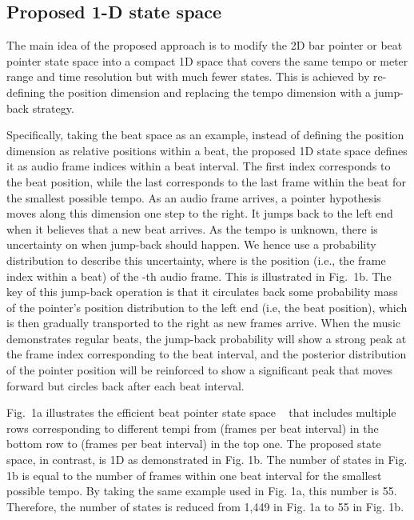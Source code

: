 \documentclass{article}
\begin{document}
\subsection{Proposed 1-D state space}
\label{ssec:1D state space}
The main idea of the proposed approach is to modify the 2D bar pointer or beat pointer state space into a compact 1D space that covers the same tempo or meter range and time resolution but with much fewer states. This is achieved by re-defining the position dimension and replacing the tempo dimension with a jump-back strategy. 

Specifically, taking the beat space as an example, instead of defining the position dimension as relative positions within a beat, the proposed 1D state space defines it as audio frame indices within a beat interval. The first index corresponds to the beat position, while the last corresponds to the last frame within the beat for the smallest possible tempo. As an audio frame arrives, a pointer hypothesis moves along this dimension one step to the right. It jumps back to the left end when it believes that a new beat arrives. As the tempo is unknown, there is uncertainty on when jump-back should happen. We hence use a probability distribution  to describe this uncertainty, where  is the position (i.e., the frame index within a beat) of the -th audio frame. This is illustrated in Fig.~1b. The key of this jump-back operation is that it circulates back some probability mass of the pointer's position distribution to the left end (i.e, the beat position), which is then gradually transported to the right as new frames arrive. When the music demonstrates regular beats, the jump-back probability will show a strong peak at the frame index corresponding to the beat interval, and the posterior distribution of the pointer position will be reinforced to show a significant peak that moves forward but circles back after each beat interval.
 
Fig.~1a illustrates the efficient beat pointer state space ~\cite{Krebs:1} that includes multiple rows 
corresponding to different tempi from  (frames per beat interval) in the bottom row to  (frames per beat interval) in the top one. The proposed state space, in contrast, is 1D as demonstrated in Fig. 1b. The number of states in Fig. 1b is equal to the number of frames within one beat interval for the smallest possible tempo. By taking the same example used in Fig. 1a, this number is 55. Therefore, the number of states is reduced from 1,449 in Fig. 1a to 55 in Fig. 1b. 
\end{document}
